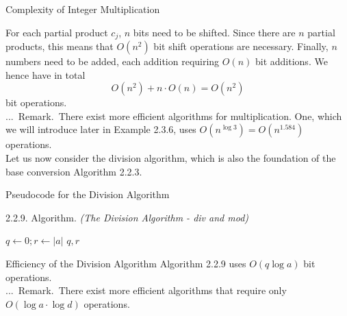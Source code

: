 \documentclass[smaller,hyperref={CJKbookmarks=true}]{beamer}
\newcounter{zhuo}[subsection]
\renewcommand{\thezhuo}{\thesection.\thesubsection.\arabic{zhuo}}
\newenvironment{REMARK}{\stepcounter{zhuo}\alert{\thezhuo.~Remark.\,}}{}
\begin{document}
\begin{frame}[c]{Complexity of Integer Multiplication}
\begin{spacing}{1.1}
For each partial product $c_j$, $n$ bits need to be shifted. Since there are $n$ partial products, this means that $O(n^2)$ bit shift operations are necessary. Finally, $n$ numbers need to be added, each addition requiring $O(n)$ bit additions. We hence have in total
\[O(n^2)+n\cdot O(n)=O(n^2)\]
bit operations.\\[7pt]
\begin{REMARK}
There exist more efficient algorithms for multiplication. One, which we will introduce later in Example 2.3.6, uses $O(n^{\log3})=O(n^{1.584})$ operations.\\[5pt]
Let us now consider the division algorithm, which is also the foundation of
the base conversion Algorithm 2.2.3.
\end{REMARK}
\end{spacing}
\end{frame}
\begin{frame}[t]{Pseudocode for the Division Algorithm}
\begin{spacing}{1.1}
\alert{2.2.9. Algorithm.} \emph{(The Division Algorithm - \sf div \emph{and} mod\emph{)}}
\IncMargin{1em}
\begin{algorithm}[H]
$q\leftarrow0;r\leftarrow|a|$\;
\Return $q,r$
\end{algorithm}\DecMargin{1em}
\end{spacing}
\end{frame}
\begin{frame}[c]{Efficiency of the Division Algorithm}
Algorithm 2.2.9 uses $O(q\log a)$ bit operations.\\
\begin{REMARK}
There exist more efficient algorithms that require only $O(\log a\cdot\log d)$ operations.
\end{REMARK}
\end{frame}
\end{document}
